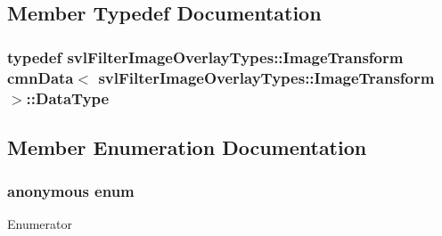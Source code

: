 \subsection{Member Typedef Documentation}
\hypertarget{classcmn_data_3_01svl_filter_image_overlay_types_1_1_image_transform_01_4_a58a4f448e85eeba8ac6a226c91e752d7}{
\subsubsection[{Data\-Type}]{\setlength{\rightskip}{0pt plus 5cm}typedef {\bf svl\-Filter\-Image\-Overlay\-Types\-::\-Image\-Transform} {\bf cmn\-Data}$<$ {\bf svl\-Filter\-Image\-Overlay\-Types\-::\-Image\-Transform} $>$\-::{\bf Data\-Type}}}\label{classcmn_data_3_01svl_filter_image_overlay_types_1_1_image_transform_01_4_a58a4f448e85eeba8ac6a226c91e752d7}


\subsection{Member Enumeration Documentation}
\hypertarget{classcmn_data_3_01svl_filter_image_overlay_types_1_1_image_transform_01_4_aa11ad1851e906a2bd3a0f100bebfd52e}{\subsubsection[{anonymous enum}]{\setlength{\rightskip}{0pt plus 5cm}anonymous enum}}\label{classcmn_data_3_01svl_filter_image_overlay_types_1_1_image_transform_01_4_aa11ad1851e906a2bd3a0f100bebfd52e}
\begin{Desc}
\item[Enumerator]\par
\begin{description}
\item[{\em 
\hypertarget{classcmn_data_3_01svl_filter_image_overlay_types_1_1_image_transform_01_4_aa11ad1851e906a2bd3a0f100bebfd52ea19f4b42a979d0470b8d1b2861a0f1e89}{I\-S\-\_\-\-S\-P\-E\-C\-I\-A\-L\-I\-Z\-E\-D}\label{classcmn_data_3_01svl_filter_image_overlay_types_1_1_image_transform_01_4_aa11ad1851e906a2bd3a0f100bebfd52ea19f4b42a979d0470b8d1b2861a0f1e89}
}]\end{description}
\end{Desc}


